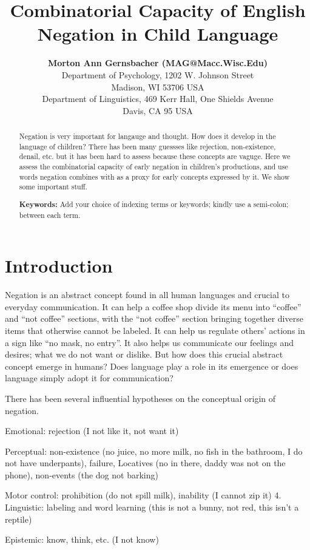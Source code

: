 \documentclass[10pt, letterpaper]{article}
\title{Combinatorial Capacity of English Negation in Child Language}
\author{{\large \bf Morton Ann Gernsbacher (MAG@Macc.Wisc.Edu)} \\ Department of Psychology, 1202 W. Johnson Street \\ Madison, WI 53706 USA \AND {\large \bf Masoud Jasbi (jasbi@ucdavis.edu)} \\ Department of Linguistics, 469 Kerr Hall, One Shields Avenue \\ Davis, CA 95 USA}
\begin{document}
\maketitle

\begin{abstract}
Negation is very important for langauge and thought. How does it develop
in the language of children? There has been many guessses like
rejection, non-existence, denail, etc. but it has been hard to assess
because these concepts are vaguge. Here we assess the combinatorial
capacity of early negation in children's productions, and use words
negation combines with as a proxy for early concepts expressed by it. We
show some important stuff.

\textbf{Keywords:}
Add your choice of indexing terms or keywords; kindly use a semi-colon;
between each term.
\end{abstract}

\hypertarget{introduction}{%
\section{Introduction}\label{introduction}}

Negation is an abstract concept found in all human languages and crucial
to everyday communication. It can help a coffee shop divide its menu
into ``coffee'' and ``not coffee'' sections, with the ``not coffee''
section bringing together diverse items that otherwise cannot be
labeled. It can help us regulate others' actions in a sign like ``no
mask, no entry''. It also helps us communicate our feelings and desires;
what we do not want or dislike. But how does this crucial abstract
concept emerge in humans? Does language play a role in its emergence or
does language simply adopt it for communication?

There has been several influential hypotheses on the conceptual origin
of negation.

Emotional: rejection (I not like it, not want it)

Perceptual: non-existence (no juice, no more milk, no fish in the
bathroom, I do not have underpants), failure, Locatives (no in there,
daddy was not on the phone), non-events (the dog not barking)

Motor control: prohibition (do not spill milk), inability (I cannot zip
it) 4. Linguistic: labeling and word learning (this is not a bunny, not
red, this isn't a reptile)

Epistemic: know, think, etc. (I not know)
\end{document}

